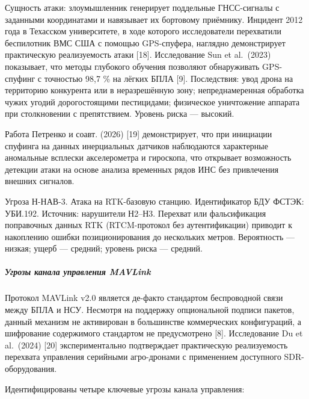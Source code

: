 \documentclass[14pt,a4paper]{extarticle}
\begin{document}
Сущность атаки: злоумышленник генерирует поддельные ГНСС-сигналы с заданными координатами и навязывает их бортовому приёмнику. Инцидент 2012 года в Техасском университете, в ходе которого исследователи перехватили беспилотник ВМС США с помощью GPS-спуфера, наглядно демонстрирует практическую реализуемость атаки {[}18{]}. Исследование Sun et al.~(2023) показывает, что методы глубокого обучения позволяют обнаруживать GPS-спуфинг с точностью 98,7 \% на лёгких БПЛА {[}9{]}. Последствия: увод дрона на территорию конкурента или в неразрешённую зону; непреднамеренная обработка чужих угодий дорогостоящими пестицидами; физическое уничтожение аппарата при столкновении с препятствием. Уровень риска --- высокий.

Работа Петренко и соавт. (2026) {[}19{]} демонстрирует, что при инициации спуфинга на данных инерциальных датчиков наблюдаются характерные аномальные всплески акселерометра и гироскопа, что открывает возможность детекции атаки на основе анализа временных рядов ИНС без привлечения внешних сигналов.

Угроза Н-НАВ-3. Атака на RTK-базовую станцию. Идентификатор БДУ ФСТЭК: УБИ.192. Источник: нарушители Н2--Н3. Перехват или фальсификация поправочных данных RTK (RTCM-протокол без аутентификации) приводит к накоплению ошибки позиционирования до нескольких метров. Вероятность --- низкая; ущерб --- средний; уровень риска --- средний.

\hypertarget{ux443ux433ux440ux43eux437ux44b-ux43aux430ux43dux430ux43bux430-ux443ux43fux440ux430ux432ux43bux435ux43dux438ux44f-mavlink}{%
\subparagraph{Угрозы канала управления MAVLink}\label{ux443ux433ux440ux43eux437ux44b-ux43aux430ux43dux430ux43bux430-ux443ux43fux440ux430ux432ux43bux435ux43dux438ux44f-mavlink}}

Протокол MAVLink v2.0 является де-факто стандартом беспроводной связи между БПЛА и НСУ. Несмотря на поддержку опциональной подписи пакетов, данный механизм не активирован в большинстве коммерческих конфигураций, а шифрование содержимого стандартом не предусмотрено {[}8{]}. Исследование Du et al.~(2024) {[}20{]} экспериментально подтверждает практическую реализуемость перехвата управления серийными агро-дронами с применением доступного SDR-оборудования.

Идентифицированы четыре ключевые угрозы канала управления:
\end{document}
